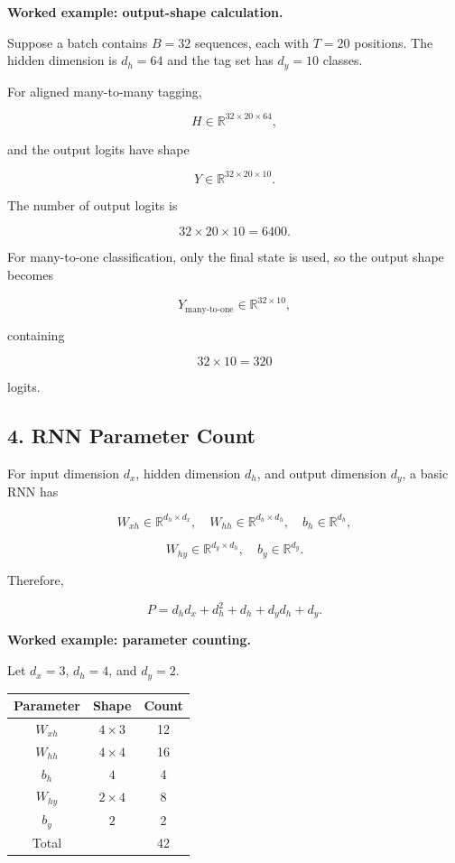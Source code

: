 \documentclass[11pt,a4paper,twoside]{article}
\newcommand{\R}{\mathbb{R}}
\begin{document}
\textbf{Worked example: output-shape calculation.}

Suppose a batch contains $B=32$ sequences, each with $T=20$ positions. The hidden dimension is $d_h=64$ and the tag set has $d_y=10$ classes.

For aligned many-to-many tagging,

\[
H\in\R^{32\times20\times64},
\]

and the output logits have shape

\[
Y\in\R^{32\times20\times10}.
\]

The number of output logits is

\[
32\times20\times10=6400.
\]

For many-to-one classification, only the final state is used, so the output shape becomes

\[
Y_{\mathrm{many\text{-}to\text{-}one}}\in\R^{32\times10},
\]

containing

\[
32\times10=320
\]

logits.

\subsection*{4. RNN Parameter Count}

For input dimension $d_x$, hidden dimension $d_h$, and output dimension $d_y$, a basic RNN has

\[
W_{xh}\in\R^{d_h\times d_x},\quad
W_{hh}\in\R^{d_h\times d_h},\quad
b_h\in\R^{d_h},
\]

\[
W_{hy}\in\R^{d_y\times d_h},\quad
b_y\in\R^{d_y}.
\]

Therefore,

\[
\boxed{P=d_hd_x+d_h^2+d_h+d_yd_h+d_y.}
\]

\textbf{Worked example: parameter counting.}

Let $d_x=3$, $d_h=4$, and $d_y=2$.

\begin{center}
\begin{tabular}{c|c|c}
\toprule
Parameter&Shape&Count\\ \midrule
$W_{xh}$&$4\times3$&12\\
$W_{hh}$&$4\times4$&16\\
$b_h$&$4$&4\\
$W_{hy}$&$2\times4$&8\\
$b_y$&$2$&2\\ \midrule
Total&&42\\ \bottomrule
\end{tabular}
\end{center}
\end{document}
